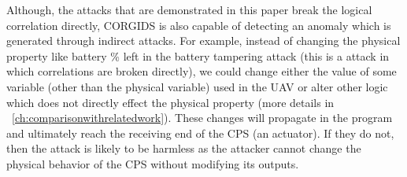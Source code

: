 Although, the attacks that are demonstrated in this paper break the logical correlation directly, \ac{CORGIDS} is also capable of detecting an anomaly which is generated through indirect attacks. For example, instead of changing the physical property like battery \% left in the battery tampering attack (this is a attack in which correlations are broken directly), we could change either the value of some variable (other than the physical variable) used in the \ac{UAV} or alter other logic which does not directly effect the physical property (more details in ~\autoref{ch:comparisonwithrelatedwork}). These changes will propagate in the program and ultimately reach the receiving end of the \ac{CPS} (an actuator). If they do not, then the attack is likely to be harmless as the attacker cannot change the physical behavior of the \ac{CPS} without modifying its outputs. 

\endinput
=====================================================================
